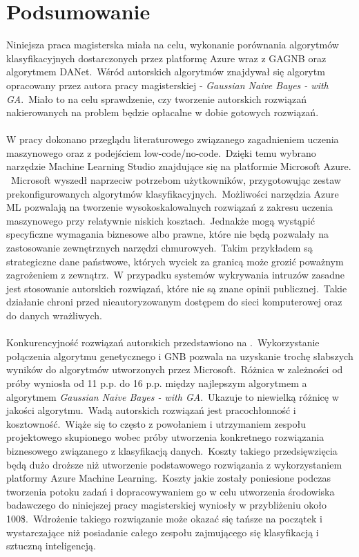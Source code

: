 \chapter{Podsumowanie}
Niniejsza praca magisterska miała na celu, wykonanie porównania algorytmów klasyfikacyjnych dostarczonych przez platformę Azure wraz z GAGNB oraz algorytmem DANet.\ Wśród autorskich algorytmów znajdywał się algorytm opracowany przez autora pracy magisterskiej - \textit{Gaussian Naive Bayes - with GA}.\ Miało to na celu sprawdzenie, czy tworzenie autorskich rozwiązań nakierowanych na problem będzie opłacalne w dobie gotowych rozwiązań.
\\ \\
W pracy dokonano przeglądu literaturowego związanego zagadnieniem uczenia maszynowego oraz z podejściem low-code/no-code.\ Dzięki temu wybrano narzędzie Machine Learning Studio znajdujące się na platformie Microsoft Azure. \ Microsoft wyszedł naprzeciw potrzebom użytkowników, przygotowując zestaw prekonfigurowanych algorytmów klasyfikacyjnych.\ Możliwości narzędzia Azure ML pozwalają na tworzenie wysokoskalowalnych rozwiązań z zakresu uczenia maszynowego przy relatywnie niskich kosztach.\ Jednakże mogą wystąpić specyficzne wymagania biznesowe albo prawne, które nie będą pozwalały na zastosowanie zewnętrznych narzędzi chmurowych.\ Takim przykładem są strategiczne dane państwowe, których wyciek za granicą może grozić poważnym zagrożeniem z zewnątrz.\ W przypadku systemów wykrywania intruzów zasadne jest stosowanie autorskich rozwiązań, które nie są znane opinii publicznej.\ Takie działanie chroni przed nieautoryzowanym dostępem do sieci komputerowej oraz do danych wrażliwych.
\\ \\
Konkurencyjność rozwiązań autorskich przedstawiono na .\ Wykorzystanie połączenia algorytmu genetycznego i GNB pozwala na uzyskanie trochę słabszych wyników do algorytmów utworzonych przez Microsoft.\ Różnica w zależności od próby wyniosła od 11 p.p. do 16 p.p. między najlepszym algorytmem a algorytmem \textit{Gaussian Naive Bayes - with GA}.\ Ukazuje to niewielką różnicę w jakości algorytmu.\ Wadą autorskich rozwiązań jest pracochłonność i kosztowność.\ Wiąże się to często z powołaniem i utrzymaniem zespołu projektowego skupionego wobec próby utworzenia konkretnego rozwiązania biznesowego związanego z klasyfikacją danych.\ Koszty takiego przedsięwzięcia będą dużo droższe niż utworzenie podstawowego rozwiązania z wykorzystaniem platformy Azure Machine Learning.\ Koszty jakie zostały poniesione podczas tworzenia potoku zadań i dopracowywaniem go w celu utworzenia środowiska badawczego do niniejszej pracy magisterskiej wyniosły w przybliżeniu około 100\$.\ Wdrożenie takiego rozwiązanie może okazać się tańsze na początek i wystarczające niż posiadanie całego zespołu zajmującego się klasyfikacją i sztuczną inteligencją.
